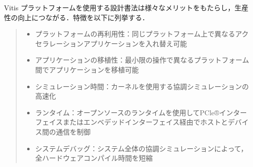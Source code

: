 \documentclass[11pt,a4j]{jreport}
\begin{document}
Vitis プラットフォーム\cite{VitisPlatform}を使用する設計書法は様々なメリットをもたらし，生産性の向上につながる．特徴を以下に列挙する．
\begin{quote}
  \begin{itemize}
    \item プラットフォームの再利用性：同じプラットフォーム上で異なるアクセラレーションアプリケーションを入れ替え可能
    \item アプリケーションの移植性：最小限の操作で異なるプラットフォーム間でアプリケーションを移植可能
    \item シミュレーション時間：カーネルを使用する協調シミュレーションの高速化
    \item ランタイム：オープンソースのランタイムを使用してPCle®インターフェイスまたはエンベデッドインターフェイス経由でホストとデバイス間の通信を制御
    \item システムデバッグ：システム全体の協調シミュレーションによって，全ハードウェアコンパイル時間を短縮
  \end{itemize}
\end{quote}
\end{document}
